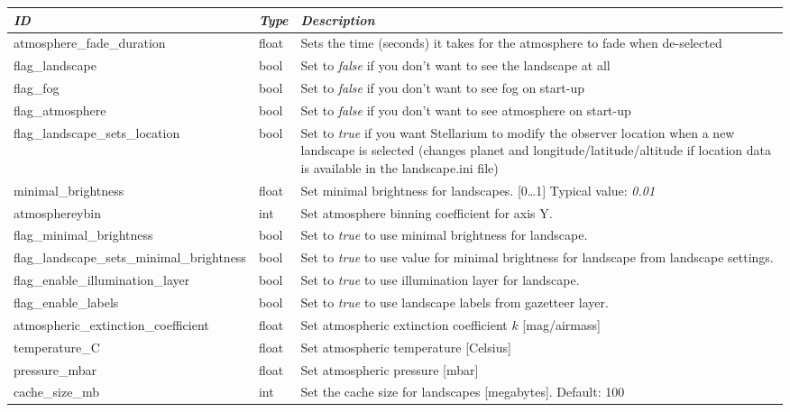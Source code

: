 \begin{longtable}{l|l|p{80mm}}\toprule
\emph{ID}                            & \emph{Type} & \emph{Description}\\\midrule
atmosphere\_fade\_duration                 & float & Sets the time (seconds) it takes for the atmosphere to fade when de-selected\\%
flag\_landscape                            & bool  & Set to \emph{false} if you don't want to see the landscape at all\\%
flag\_fog                                  & bool  & Set to \emph{false} if you don't want to see fog on start-up\\%
flag\_atmosphere                           & bool  & Set to \emph{false} if you don't want to see atmosphere on start-up\\%
flag\_landscape\_sets\_location            & bool  & Set to \emph{true} if you want Stellarium to modify the observer location 
                                                     when a new landscape is selected (changes planet and longitude/latitude/altitude 
                                                     if location data is available in the landscape.ini file)\\%
minimal\_brightness                        & float & Set minimal brightness for landscapes. [0\ldots1] Typical value: \emph{0.01}\\%
atmosphereybin						       & int   & Set atmosphere binning coefficient for axis Y.\\%
flag\_minimal\_brightness                  & bool  & Set to \emph{true} to use minimal brightness for landscape.\\%
flag\_landscape\_sets\_minimal\_brightness & bool  & Set to \emph{true} to use value for minimal brightness for landscape from landscape settings.\\%
flag\_enable\_illumination\_layer          & bool  & Set to \emph{true} to use illumination layer for landscape.\\%
flag\_enable\_labels                       & bool  & Set to \emph{true} to use landscape labels from gazetteer layer.\\%
atmospheric\_extinction\_coefficient       & float & Set atmospheric extinction coefficient $k$ [mag/airmass]\\%
temperature\_C                             & float & Set atmospheric temperature [Celsius]\\%
pressure\_mbar                             & float & Set atmospheric pressure [mbar]\\%
cache\_size\_mb                            & int   & Set the cache size for landscapes [megabytes]. Default: 100\\\bottomrule
\end{longtable}

